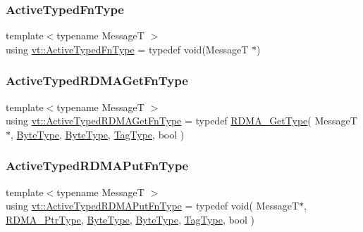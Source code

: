 \mbox{\label{namespacevt_a54eefd5373739c7365058b0d22fea6e2}} 
\subsubsection{\texorpdfstring{Active\+Typed\+Fn\+Type}{ActiveTypedFnType}}
{\footnotesize\ttfamily template$<$typename MessageT $>$ \\
using \hyperlink{namespacevt_a54eefd5373739c7365058b0d22fea6e2}{vt\+::\+Active\+Typed\+Fn\+Type} = typedef void(MessageT $\ast$)}

\mbox{\label{namespacevt_add83fe11410931719f6543a575acfe87}} 
\subsubsection{\texorpdfstring{Active\+Typed\+R\+D\+M\+A\+Get\+Fn\+Type}{ActiveTypedRDMAGetFnType}}
{\footnotesize\ttfamily template$<$typename MessageT $>$ \\
using \hyperlink{namespacevt_add83fe11410931719f6543a575acfe87}{vt\+::\+Active\+Typed\+R\+D\+M\+A\+Get\+Fn\+Type} = typedef \hyperlink{namespacevt_a1cab7f4860f65a49ad2c042d6240f288}{R\+D\+M\+A\+\_\+\+Get\+Type}( MessageT$\ast$, \hyperlink{namespacevt_aab8d55968084610ce3b17057981e9300}{Byte\+Type}, \hyperlink{namespacevt_aab8d55968084610ce3b17057981e9300}{Byte\+Type}, \hyperlink{namespacevt_a84ab281dae04a52a4b243d6bf62d0e52}{Tag\+Type}, bool )}

\mbox{\label{namespacevt_a881ee9bd1e4e71905da1f563ee26ce25}} 
\subsubsection{\texorpdfstring{Active\+Typed\+R\+D\+M\+A\+Put\+Fn\+Type}{ActiveTypedRDMAPutFnType}}
{\footnotesize\ttfamily template$<$typename MessageT $>$ \\
using \hyperlink{namespacevt_a881ee9bd1e4e71905da1f563ee26ce25}{vt\+::\+Active\+Typed\+R\+D\+M\+A\+Put\+Fn\+Type} = typedef void( MessageT$\ast$, \hyperlink{namespacevt_a9e2c953286c7616f7c218e9951790776}{R\+D\+M\+A\+\_\+\+Ptr\+Type}, \hyperlink{namespacevt_aab8d55968084610ce3b17057981e9300}{Byte\+Type}, \hyperlink{namespacevt_aab8d55968084610ce3b17057981e9300}{Byte\+Type}, \hyperlink{namespacevt_a84ab281dae04a52a4b243d6bf62d0e52}{Tag\+Type}, bool )}

